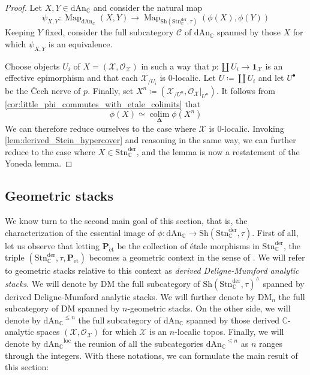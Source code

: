 \documentclass[12pt,a4paper,reqno]{amsart}
\theoremstyle{plain}
\theoremstyle{definition}
\theoremstyle{remark}
\numberwithin{equation}{section}
\begin{document}
\begin{proof}
	Let $X,Y \in {\mathrm{dAn}_{\mathbb C}}$ and consider the natural map
	\[ \psi_{X,Y} \colon \operatorname{Map}_{\mathrm{dAn}_{\mathbb C}}(X,Y) \to \operatorname{Map}_{{\mathrm{Sh}}({\mathrm{Stn}^{\mathrm{der}}_{\mathbb C}}, \tau)}(\phi(X), \phi(Y)) \]
	Keeping $Y$ fixed, consider the full subcategory ${\mathcal C}$ of ${\mathrm{dAn}_{\mathbb C}}$ spanned by those $X$ for which $\psi_{X,Y}$ is an equivalence.
	
	Choose objects $U_i$ of $X = ({\mathcal X}, {\mathcal O}_{\mathcal X})$ in such a way that $p \colon \coprod U_i \to \mathbf 1_{\mathcal X}$ is an effective epimorphism and that each ${\mathcal X}_{/U_i}$ is $0$-localic. Let $U \coloneqq \coprod U_i$ and let $U^\bullet$ be the \v{C}ech nerve of $p$. Finally, set $X^n \coloneqq ({\mathcal X}_{/U^n}, {\mathcal O}_{\mathcal X}|_{U^n})$.
	It follows from \cref{cor:little_phi_commutes_with_etale_colimits} that
	\[ \phi(X) \simeq \operatorname*{colim}_{\mathbf \Delta} \phi(X^n) \]
	We can therefore reduce ourselves to the case where ${\mathcal X}$ is $0$-localic.
	Invoking \cref{lem:derived_Stein_hypercover} and reasoning in the same way, we can further reduce to the case where $X \in {\mathrm{Stn}^{\mathrm{der}}_{\mathbb C}}$, and the lemma is now a restatement of the Yoneda lemma.
\end{proof}

\subsection{Geometric stacks}

We know turn to the second main goal of this section, that is, the characterization of the essential image of $\phi \colon {\mathrm{dAn}_{\mathbb C}} \to {\mathrm{Sh}}({\mathrm{Stn}^{\mathrm{der}}_{\mathbb C}}, \tau)$.
First of all, let us observe that letting ${\mathbf P}_{\mathrm{\acute{e}t}}$ be the collection of \'etale morphisms in ${\mathrm{Stn}^{\mathrm{der}}_{\mathbb C}}$, the triple $({\mathrm{Stn}^{\mathrm{der}}_{\mathbb C}}, \tau, {\mathbf P}_{\mathrm{\acute{e}t}})$ becomes a geometric context in the sense of \cite[Definition 2.11]{Porta_Yu_Higher_analytic_stacks_2014}.
We will refer to geometric stacks relative to this context as \emph{derived {Deligne-Mumford\xspace} analytic stacks}.
We will denote by $\mathrm{DM}$ the full subcategory of ${\mathrm{Sh}}({\mathrm{Stn}^{\mathrm{der}}_{\mathbb C}}, \tau)^\wedge$ spanned by derived {Deligne-Mumford\xspace} analytic stacks.
We will further denote by $\mathrm{DM}_n$ the full subcategory of $\mathrm{DM}$ spanned by $n$-geometric stacks.
On the other side, we will denote by ${\mathrm{dAn}_{\mathbb C}}^{\le n}$ the full subcategory of ${\mathrm{dAn}_{\mathbb C}}$ spanned by those derived {$\mathbb C$-analytic\xspace} spaces $({\mathcal X}, {\mathcal O}_{\mathcal X})$ for which ${\mathcal X}$ is an $n$-localic topos. Finally, we will denote by ${\mathrm{dAn}_{\mathbb C}}^{\mathrm{loc}}$ the reunion of all the subcategories ${\mathrm{dAn}_{\mathbb C}}^{\le n}$ as $n$ ranges through the integers.
With these notations, we can formulate the main result of this section:
\end{document}
